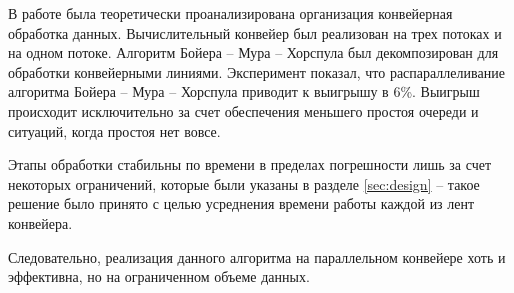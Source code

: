В работе была теоретически проанализирована организация конвейерная обработка данных. Вычислительный конвейер был реализован на трех потоках и на одном потоке. Алгоритм Бойера -- Мура -- Хорспула был декомпозирован для обработки конвейерными линиями. 
Эксперимент показал, что распараллеливание алгоритма Бойера -- Мура -- Хорспула приводит к выигрышу в 6\%. Выигрыш происходит исключительно за счет обеспечения меньшего простоя очереди и ситуаций, когда простоя нет вовсе. 

Этапы обработки стабильны по времени в пределах погрешности лишь за счет некоторых ограничений, которые были указаны в разделе \ref{sec:design} -- такое решение было принято с целью усреднения времени работы каждой из лент конвейера. 

Следовательно, реализация данного алгоритма на параллельном конвейере хоть и эффективна, но на ограниченном объеме данных. 